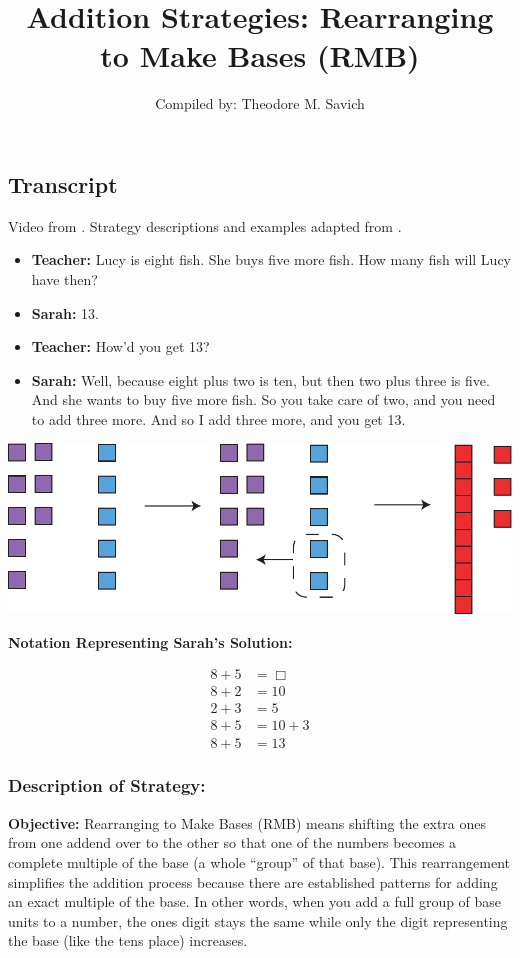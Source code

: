\documentclass[11pt]{article}
\title{Addition Strategies: Rearranging to Make Bases (RMB)}
\author{Compiled by: Theodore M. Savich}
\begin{document}
\maketitle
\subsection*{Transcript}
Video from \textcite{Carpenter1999}. Strategy descriptions and examples adapted from \textcite{HackenbergCourseNotes}. 
\begin{itemize}
\item \textbf{Teacher:} Lucy is eight fish. She buys five more fish. How many fish will Lucy have then?
\item \textbf{Sarah:}  13. 
\item \textbf{Teacher:} How'd you get 13? 
\item \textbf{Sarah:} Well, because eight plus two is ten, but then two plus three is five. And she wants to buy five more fish. So you take care of two, and you need to add three more. And so I add three more, and you get 13.
\end{itemize}

\includegraphics[width=.8\textwidth]{images/Easy_Pictures/SAR_ADD_RMB/PDF/SAR_ADD_RMB.pdf}

\noindent \textbf{Notation Representing Sarah's Solution:}

\begin{align*}
8 + 5 &= \Box \\
8+2 &= 10\\
2+3 &= 5\\
8+5&= 10 + 3\\
8+5 &= 13
\end{align*}

\subsubsection*{Description of Strategy:}

 \textbf{Objective:} Rearranging to Make Bases (RMB) means shifting the extra ones from one addend over to the other so that one of the numbers becomes a complete multiple of the base (a whole ``group'' of that base). This rearrangement simplifies the addition process because there are established patterns for adding an exact multiple of the base. In other words, when you add a full group of base units to a number, the ones digit stays the same while only the digit representing the base (like the tens place) increases.
   
\end{document}
